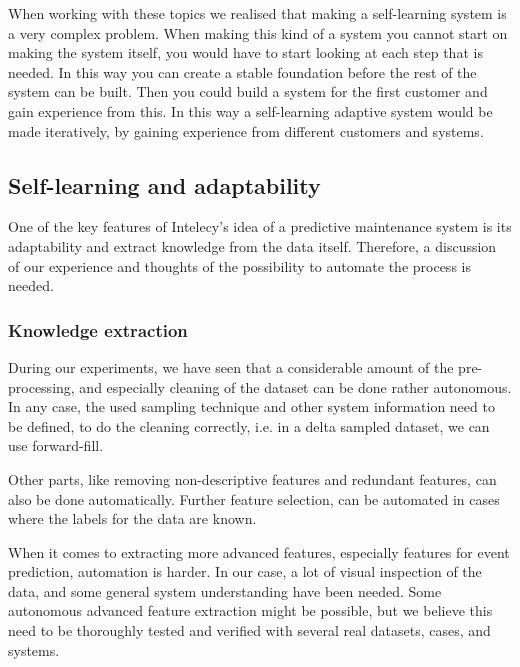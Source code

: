 \documentclass[english, a4paper]{report}
\begin{document}
{{        \par
        When working with these topics we realised that making a self-learning system is a very complex problem. When making this kind of a system you cannot start on making the system itself, you would have to start looking at each step that is needed. In this way you can create a stable foundation before the rest of the system can be built. Then you could build a system for the first customer and gain experience from this. In this way a self-learning adaptive system would be made iteratively, by gaining experience from different customers and systems.

        \subsection{Self-learning and adaptability}
        {
            One of the key features of Intelecy's idea of a predictive maintenance system is its adaptability and extract knowledge from the data itself. Therefore, a discussion of our experience and thoughts of the possibility to automate the process is needed.
            \subsubsection{Knowledge extraction}
            {
                During our experiments, we have seen that a considerable amount of the pre-processing, and especially cleaning of the dataset can be done rather autonomous. In any case, the used sampling technique and other system information need to be defined, to do the cleaning correctly, i.e. in a delta sampled dataset, we can use forward-fill.
                \par
                Other parts, like removing non-descriptive features and redundant features, can also be done automatically. Further feature selection, can be automated in cases where the labels for the data are known.
                \par
                When it comes to extracting more advanced features, especially features for event prediction, automation is harder. In our case, a lot of visual inspection of the data, and some general system understanding have been needed. Some autonomous advanced feature extraction might be possible, but we believe this need to be thoroughly tested and verified with several real datasets, cases, and systems.
            }
            
}}}
\end{document}
